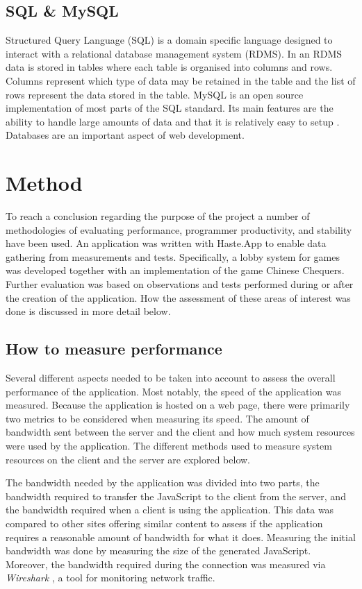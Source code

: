 \documentclass[a4paper]{article}
\begin{document}
\subsection{SQL \& MySQL}
Structured Query Language (SQL) is a domain specific language designed to interact with a relational database management system (RDMS). In an RDMS data is stored in tables where each table is organised into columns and rows. Columns represent which type of data may be retained in the table and the list of rows represent the data stored in the table. MySQL is an open source implementation of most parts of the SQL standard. Its main features are the ability to handle large amounts of data and that it is relatively easy to setup \cite{mysql-features}. Databases are an important aspect of web development.

\newpage
\section{Method}
\label{sec:method}
To reach a conclusion regarding the purpose of the project a number of methodologies of evaluating performance, programmer productivity, and stability have been used. An application was written with Haste.App to enable data gathering from measurements and tests. Specifically, a lobby system for games was developed together with an implementation of the game Chinese Chequers. Further evaluation was based on observations and tests performed during or after the creation of the application. How the assessment of these areas of interest was done is discussed in more detail below. 


\subsection{How to measure performance}
\label{sub:method-performance}
Several different aspects needed to be taken into account to assess the overall performance of the application. Most notably, the speed of the application was measured. Because the application is hosted on a web page, there were primarily two metrics to be considered when measuring its speed. The amount of bandwidth sent between the server and the client and how much system resources were used by the application. The different methods used to measure system resources on the client and the server are explored below.

The bandwidth needed by the application was divided into two parts, the bandwidth required to transfer the JavaScript to the client from the server, and the bandwidth required when a client is using the application. This data was compared to other sites offering similar content to assess if the application requires a reasonable amount of bandwidth for what it does. Measuring the initial bandwidth was done by measuring the size of the generated JavaScript. Moreover, the bandwidth required during the connection was measured via \textit{Wireshark} \cite{wireshark-website}, a tool for monitoring network traffic.
\end{document}
